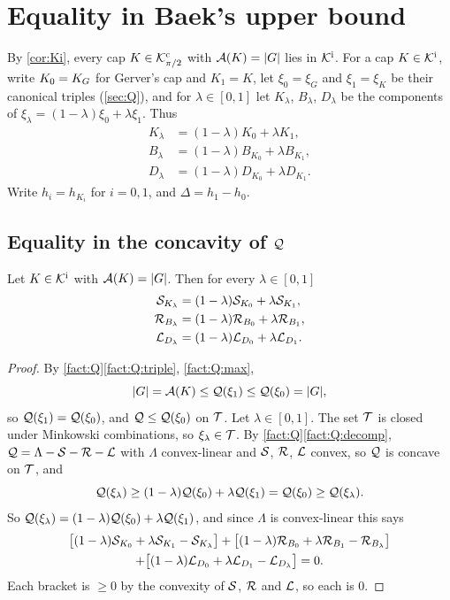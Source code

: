 \section{Equality in Baek's upper bound}\label{sec:equality}

By \cref{cor:Ki}, every cap $K\in\mathcal{K}^{\mathrm{c}}_{\pi/2}$ with $\mathcal{A}(K)=\lvert G\rvert$ lies in
$\mathcal{K}^{\mathrm{i}}$. For a cap $K\in\mathcal{K}^{\mathrm{i}}$, write $K_0=K_G$ for Gerver's cap and $K_1=K$, let
$\xi_0=\xi_G$ and $\xi_1=\xi_K$ be their canonical triples (\cref{sec:Q}), and
for $\lambda\in[0,1]$ let $K_\lambda$, $B_\lambda$, $D_\lambda$ be the
components of $\xi_\lambda=(1-\lambda)\xi_0+\lambda\xi_1$. Thus
\begin{align*}
  K_\lambda&=(1-\lambda)K_0+\lambda K_1,\\
  B_\lambda&=(1-\lambda)B_{K_0}+\lambda B_{K_1},\\
  D_\lambda&=(1-\lambda)D_{K_0}+\lambda D_{K_1}.
\end{align*}
Write $h_i=h_{K_i}$ for $i=0,1$, and $\Delta=h_1-h_0$.

\subsection{Equality in the concavity of \texorpdfstring{$\mathcal{Q}$}{Q}}

\begin{lemma}\label{lem:equality}
Let $K\in\mathcal{K}^{\mathrm{i}}$ with $\mathcal{A}(K)=\lvert G\rvert$. Then for every $\lambda\in[0,1]$
\begin{align*}
  \mathcal{S}_{K_\lambda}&=(1-\lambda)\mathcal{S}_{K_0}+\lambda\mathcal{S}_{K_1},\\
  \mathcal{R}_{B_\lambda}&=(1-\lambda)\mathcal{R}_{B_0}+\lambda\mathcal{R}_{B_1},\\
  \mathcal{L}_{D_\lambda}&=(1-\lambda)\mathcal{L}_{D_0}+\lambda\mathcal{L}_{D_1}.
\end{align*}
\end{lemma}

\begin{proof}
By \cref{fact:Q}\ref{fact:Q:triple}, \ref{fact:Q:max},
\[
  \lvert G\rvert=\mathcal{A}(K)\le\mathcal{Q}(\xi_1)\le\mathcal{Q}(\xi_0)=\lvert G\rvert,
\]
so $\mathcal{Q}(\xi_1)=\mathcal{Q}(\xi_0)$, and $\mathcal{Q}\le\mathcal{Q}(\xi_0)$ on $\mathcal{T}$. Let
$\lambda\in[0,1]$. The set $\mathcal{T}$ is closed under Minkowski combinations, so
$\xi_\lambda\in\mathcal{T}$. By
\cref{fact:Q}\ref{fact:Q:decomp}, $\mathcal{Q}=\Lambda-\mathcal{S}-\mathcal{R}-\mathcal{L}$ with $\Lambda$
convex-linear and $\mathcal{S}$, $\mathcal{R}$, $\mathcal{L}$ convex, so $\mathcal{Q}$ is concave on $\mathcal{T}$, and
\[
  \mathcal{Q}(\xi_\lambda)\ge(1-\lambda)\mathcal{Q}(\xi_0)+\lambda\mathcal{Q}(\xi_1)=\mathcal{Q}(\xi_0)
    \ge\mathcal{Q}(\xi_\lambda).
\]
So $\mathcal{Q}(\xi_\lambda)=(1-\lambda)\mathcal{Q}(\xi_0)+\lambda\mathcal{Q}(\xi_1)$, and since
$\Lambda$ is convex-linear this says
\begin{multline*}
  \bigl[(1-\lambda)\mathcal{S}_{K_0}+\lambda\mathcal{S}_{K_1}-\mathcal{S}_{K_\lambda}\bigr]+\bigl[(1
    -\lambda)\mathcal{R}_{B_0}+\lambda\mathcal{R}_{B_1}-\mathcal{R}_{B_\lambda}\bigr]\\
  +\bigl[(1-\lambda)\mathcal{L}_{D_0}+\lambda\mathcal{L}_{D_1}-\mathcal{L}_{D_\lambda}\bigr]=0 .
\end{multline*}
Each bracket is $\ge0$ by the convexity of $\mathcal{S}$, $\mathcal{R}$ and $\mathcal{L}$, so each is
$0$.
\end{proof}

